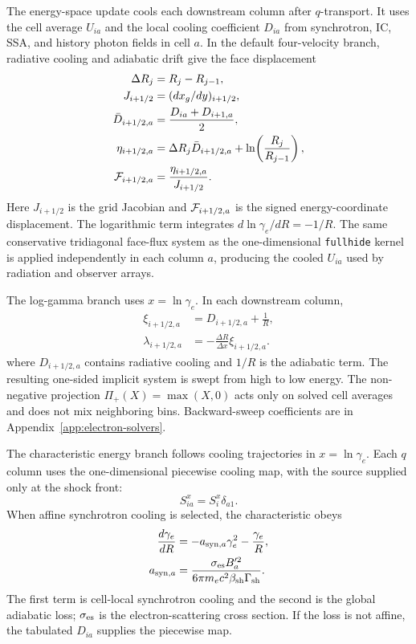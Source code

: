 \documentclass[twocolumn]{aastex702}
\begin{document}
The energy-space update cools each downstream column after \(q\)-transport.  It
uses the cell average \(U_{ia}\) and the local cooling coefficient \(D_{ia}\)
from synchrotron, IC, SSA, and history photon fields in cell \(a\).  In the
default four-velocity branch, radiative cooling and adiabatic drift give the face
displacement
\begin{equation}
\begin{aligned}
\Delta R_j&=R_j-R_{j-1},\\
J_{i+1/2}&=(dx_g/dy)_{i+1/2},\\
\bar D_{i+1/2,a}&=\frac{D_{ia}+D_{i+1,a}}{2},\\
\eta_{i+1/2,a}
&=\Delta R_j\bar D_{i+1/2,a}
+\ln\!\left(\frac{R_j}{R_{j-1}}\right),\\
{\cal F}_{i+1/2,a}
&=\frac{\eta_{i+1/2,a}}{J_{i+1/2}} .
\end{aligned}
\end{equation}
Here \(J_{i+1/2}\) is the grid Jacobian and \({\cal F}_{i+1/2,a}\) is the signed
energy-coordinate displacement.  The logarithmic term integrates
\(d\ln\gamma_e/dR=-1/R\).  The same conservative tridiagonal face-flux system as
the one-dimensional \texttt{fullhide} kernel is applied independently in each
column \(a\), producing the cooled \(U_{ia}\) used by radiation and observer
arrays.

The log-gamma branch uses \(x=\ln\gamma_e\).  In each downstream column,
\begin{equation}
\begin{aligned}
\xi_{i+1/2,a}
&=D_{i+1/2,a}+\frac{1}{R},\\
\lambda_{i+1/2,a}
&=-\frac{\Delta R}{\Delta x}\xi_{i+1/2,a}.
\end{aligned}
\end{equation}
where \(D_{i+1/2,a}\) contains radiative cooling and \(1/R\) is the adiabatic
term.  The resulting one-sided implicit system is swept from high to low energy.
The non-negative projection \(\Pi_+(X)=\max(X,0)\) acts only on solved cell
averages and does not mix neighboring bins.  Backward-sweep coefficients are in
Appendix~\ref{app:electron-solvers}.

The characteristic energy branch follows cooling trajectories in
\(x=\ln\gamma_e\).  Each \(q\) column uses the one-dimensional piecewise cooling
map, with the source supplied only at the shock front:
\begin{equation}
S_{ia}^{x}=S_i^x\delta_{a1}.
\end{equation}
When affine synchrotron cooling is selected, the characteristic obeys
\begin{equation}
\begin{aligned}
\frac{d\gamma_e}{dR}
&=-a_{{\rm syn},a}\gamma_e^2-\frac{\gamma_e}{R},\\
a_{{\rm syn},a}
&=\frac{\sigma_{\rm es} B_a'^2}{6\pi m_e c^2\beta_{\rm sh}\Gamma_{\rm sh}} .
\end{aligned}
\end{equation}
The first term is cell-local synchrotron cooling and the second is the global
adiabatic loss; \(\sigma_{\rm es}\) is the electron-scattering cross section.  If
the loss is not affine, the tabulated \(D_{ia}\) supplies the piecewise map.
\end{document}
